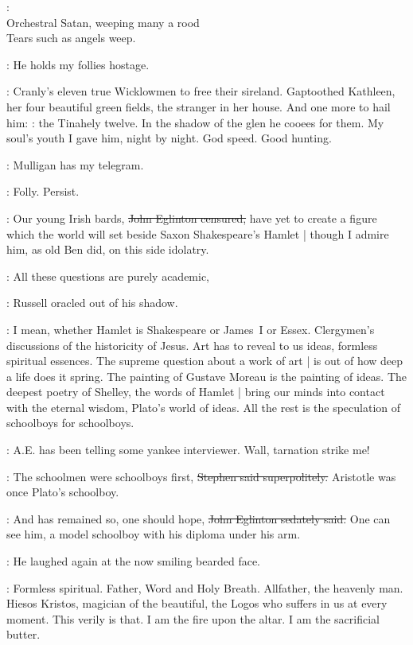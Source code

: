 \StephenInt: \\
    Orchestral Satan, weeping many a rood \\
    Tears such as angels weep. \\

\StephenInt:
He holds my follies hostage.

\StephenInt:
Cranly's eleven true Wicklowmen to free their sireland.
Gaptoothed Kathleen,
her four beautiful green fields,
the stranger in her house.
And one more to hail him:
:
the Tinahely twelve.
In the shadow of the glen
he cooees for them.
My soul's youth I gave him, night by night.
God speed.
Good hunting.%

\StephenInt:
Mulligan has my telegram.

\StephenInt:
Folly. Persist.

\eglinton:
Our young Irish bards,
\sout{John Eglinton censured,}
have yet to create a figure
which the world will set beside Saxon Shakespeare's Hamlet |
though I admire him,
as old Ben did,
on this side idolatry.

\AErussell:
All these questions are purely academic,

:
Russell oracled out of his shadow.

\AErussell:
I mean, whether Hamlet is Shakespeare or James~I or Essex.
Clergymen's discussions of the historicity of Jesus.
Art has to reveal to us ideas,
formless spiritual essences.
The supreme question about a work of art |
is out of how deep a life does it spring.
The painting of Gustave Moreau is the painting of ideas.
The deepest poetry of Shelley,
the words of Hamlet |
bring our minds into contact with the eternal wisdom,
Plato's world of ideas.
All the rest is the speculation of schoolboys for schoolboys.

\StephenInt:
A.E. has been telling some yankee interviewer.
Wall, tarnation strike me!

\Stephen:
The schoolmen were schoolboys first,
\sout{Stephen said superpolitely.}
Aristotle was once Plato's schoolboy.

\eglinton:
And has remained so,
one should hope,
\sout{John Eglinton sedately said.}
One can see him,
a model schoolboy with his diploma under his arm.

:
He laughed again
at the now smiling bearded face.

\StephenInt:
Formless spiritual.
Father, Word and Holy Breath.
Allfather, the heavenly man.
Hiesos Kristos, magician of the beautiful,
the Logos who suffers in us at every moment.
This verily is that.
I am the fire upon the altar.
I am the sacrificial butter.

